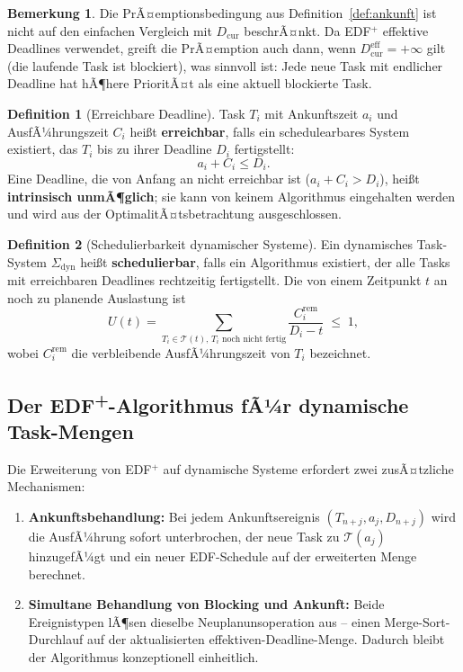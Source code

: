 ﻿\documentclass[a4paper,12pt]{article}
\theoremstyle{definition}
\newtheorem{definition}{Definition}
\newtheorem{bemerkung}{Bemerkung}
\begin{document}
	\begin{bemerkung}
		Die PrÃ¤emptionsbedingung aus Definition~\ref{def:ankunft} ist nicht auf den
		einfachen Vergleich mit $D_{\mathrm{cur}}$ beschrÃ¤nkt. Da EDF$^+$ effektive
		Deadlines verwendet, greift die PrÃ¤emption auch dann, wenn
		$D_{\mathrm{cur}}^{\text{eff}} = +\infty$ gilt (die laufende Task ist blockiert),
		was sinnvoll ist: Jede neue Task mit endlicher Deadline hat hÃ¶here PrioritÃ¤t
		als eine aktuell blockierte Task.
	\end{bemerkung}

	\begin{definition}[Erreichbare Deadline]
		Task $T_i$ mit Ankunftszeit $a_i$ und AusfÃ¼hrungszeit $C_i$ hei\ss{}t
		\textbf{erreichbar}, falls ein schedulearbares System existiert, das $T_i$
		bis zu ihrer Deadline $D_i$ fertigstellt:
		\[
		a_i + C_i \le D_i.
		\]
		Eine Deadline, die von Anfang an nicht erreichbar ist ($a_i + C_i > D_i$),
		hei\ss{}t \textbf{intrinsisch unmÃ¶glich}; sie kann von keinem Algorithmus
		eingehalten werden und wird aus der OptimalitÃ¤tsbetrachtung ausgeschlossen.
	\end{definition}

	\begin{definition}[Schedulierbarkeit dynamischer Systeme]
		\label{def:sched_dyn}
		Ein dynamisches Task-System $\Sigma_{\mathrm{dyn}}$ hei\ss{}t
		\textbf{schedulierbar}, falls ein Algorithmus existiert, der alle Tasks mit
		erreichbaren Deadlines rechtzeitig fertigstellt. Die von einem Zeitpunkt $t$
		an noch zu planende Auslastung ist
		\[
		U(t) = \sum_{T_i \in \mathcal{T}(t),\, T_i \text{ noch nicht fertig}}
		\frac{C_i^{\text{rem}}}{D_i - t} \;\le\; 1,
		\]
		wobei $C_i^{\text{rem}}$ die verbleibende AusfÃ¼hrungszeit von $T_i$ bezeichnet.
	\end{definition}

	\subsection{Der EDF\textsuperscript{+}-Algorithmus fÃ¼r dynamische Task-Mengen}

	Die Erweiterung von EDF$^+$ auf dynamische Systeme erfordert zwei zusÃ¤tzliche
	Mechanismen:
	\begin{enumerate}
		\item \textbf{Ankunftsbehandlung:} Bei jedem Ankunftsereignis $(T_{n+j}, a_j, D_{n+j})$
		      wird die AusfÃ¼h\-rung sofort unterbrochen, der neue Task zu $\mathcal{T}(a_j)$
		      hinzugefÃ¼gt und ein neuer EDF-Schedule auf der erweiterten Menge berechnet.
		\item \textbf{Simultane Behandlung von Blocking und Ankunft:} Beide Ereignistypen
		      lÃ¶sen dieselbe Neuplanunsoperation aus -- einen Merge-Sort-Durchlauf auf
		      der aktualisierten effektiven-Deadline-Menge. Dadurch bleibt der Algorithmus
		      konzeptionell einheitlich.
	\end{enumerate}
\end{document}
